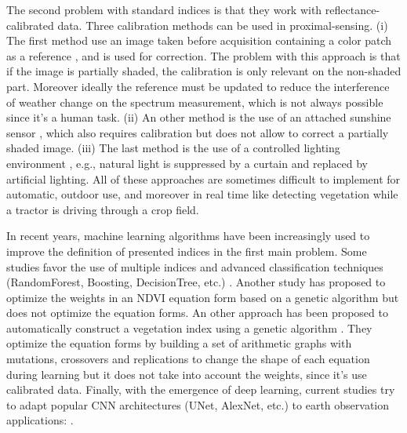 \documentclass[../thesis.tex]{subfiles}
\begin{document}
	\newpage
	The second problem with standard indices is that they work with reflectance-calibrated data. Three calibration methods can be used in proximal-sensing. (i) The first method use an image taken before acquisition containing a color patch as a reference \cite{Yahui2019, rs11202428}, and is used for correction. The problem with this approach is that if the image is partially shaded, the calibration is only relevant on the non-shaded part. Moreover ideally the reference must be updated to reduce the interference of weather change on the spectrum measurement, which is not always possible since it's a human task. (ii) An other method is the use of an attached sunshine sensor \cite{gilliot:hal-02738181}, which also requires calibration but does not allow to correct a partially shaded image. (iii) The last method is the use of a controlled lighting environment \cite{Chebrolu2017, 8793974}, e.g., natural light is suppressed by a curtain and replaced by artificial lighting. All of these approaches are sometimes difficult to implement for automatic, outdoor use, and moreover in real time like detecting vegetation while a tractor is driving through a crop field.
	
	In recent years, machine learning algorithms have been increasingly used to improve the definition of presented indices in the first main problem. Some studies favor the use of multiple indices and advanced classification techniques (RandomForest, Boosting, DecisionTree, etc.) \cite{OLDELAND20101155, PENABARRAGAN20111301, NguyRobertson2012GreenLA, Shishir2018, w13040547, LU202142}. Another study has proposed to optimize the weights in an NDVI equation form based on a genetic algorithm \cite{GeneticKabiri} but does not optimize the equation forms. An other approach has been proposed to automatically construct a vegetation index using a genetic algorithm \cite{GeneticAlbarracin}. They optimize the equation forms by building a set of arithmetic graphs with mutations, crossovers and replications to change the shape of each equation during learning but it does not take into account the weights, since it's use calibrated data. Finally, with the emergence of deep learning, current studies try to adapt popular CNN architectures (UNet, AlexNet, etc.) to earth observation applications: \cite{rs10121946, gaetano:hal-01931435, 1.JRS.12.025010, Kussul2017DeepLC}. 
	
\end{document}
